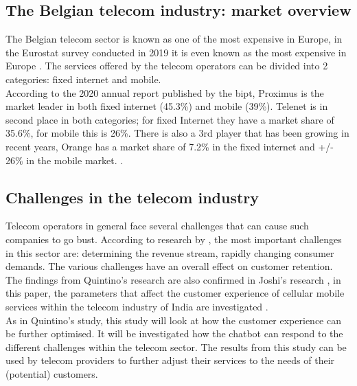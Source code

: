\subsection{The Belgian telecom industry: market overview}
The Belgian telecom sector is known as one of the most expensive in Europe, in the Eurostat survey conducted in 2019 it is even known as the most expensive in Europe \citep{Eurostat2020}. The services offered by the telecom operators can be divided into 2 categories: fixed internet and mobile.\\
\break
According to the 2020 annual report published by the \acrfull{bipt}, Proximus is the market leader in both fixed internet (45.3\%) and mobile (39\%). Telenet is in second place in both categories; for fixed Internet they have a market share of 35.6\%, for mobile this is 26\%. There is also a 3rd player that has been growing in recent years, Orange has a market share of 7.2\% in the fixed internet and +/- 26\% in the mobile market. \citep*{BIPT2021,VanLeemputten2021}.\\

\subsection{Challenges in the telecom industry}
Telecom operators in general face several challenges that can cause such companies to go bust. According to research by \citeauthor{Quintino2019} \citep*{Quintino2019, Malviya2012}, the most important challenges in this sector are: determining the revenue stream, rapidly changing consumer demands. The various challenges have an overall effect on customer retention. The findings from Quintino's research are also confirmed in Joshi's research \citep{Joshi2014}, in this paper, the parameters that affect the customer experience of cellular mobile services within the telecom industry of India are investigated \citep*{Joshi2014, Quintino2019, Malviya2012}.\\
\break
As in Quintino's study, this study will look at how the customer experience can be further optimised. It will be investigated how the chatbot can respond to the different challenges within the telecom sector. The results from this study can be used by telecom providers to further adjust their services to the needs of their (potential) customers.
